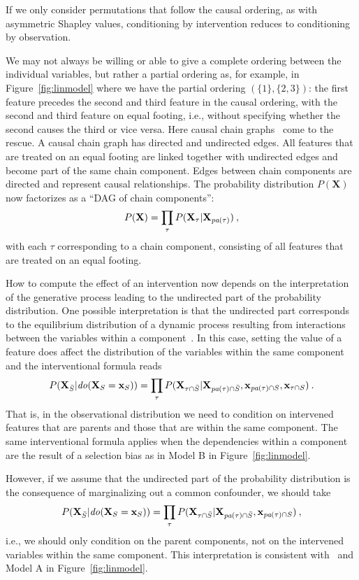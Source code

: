 \documentclass{article}
\newcommand{\vX}{\mathbf{X}}
\newcommand{\vx}{\mathbf{x}}
\newcommand{\dodo}{\mathit{do}}
\newcommand{\lvdo}[1]{\dodo(\vX_{#1} = \vx_{#1})}
\newcommand{\spa}{\mathop{\textit{\scriptsize pa}}}
\begin{document}
If we only consider permutations that follow the causal ordering, as with asymmetric Shapley values, conditioning by intervention reduces to conditioning by observation.

We may not always be willing or able to give a complete ordering between the individual variables, but rather a partial ordering as, for example, in Figure~\ref{fig:linmodel} where we have the partial ordering $(\{1\},\{2,3\})$: the first feature precedes the second and third feature in the causal ordering, with the second and third feature on equal footing, i.e., without specifying whether the second causes the third or vice versa. Here causal chain graphs~\cite{lauritzen2002chain} come to the rescue. A causal chain graph has directed and undirected edges. All features that are treated on an equal footing are linked together with undirected edges and become part of the same chain component. Edges between chain components are directed and represent causal relationships. The probability distribution $P(\vX)$ now factorizes as a ``DAG of chain components'':
\[
P(\vX) = \prod_{\tau} P(\vX_\tau|\vX_{\spa(\tau)}) \: ,
\]
with each $\tau$ corresponding to a chain component, consisting of all features that are treated on an equal footing.

How to compute the effect of an intervention now depends on the interpretation of the generative process leading to the undirected part of the probability distribution. One possible interpretation is that the undirected part corresponds to the equilibrium distribution of a dynamic process resulting from interactions between the variables within a component~\cite{lauritzen2002chain}. In this case, setting the value of a feature does affect the distribution of the variables within the same component and the interventional formula reads
\[
P(\vX_{\bar{S}}|\lvdo{S}) = \prod_{\tau} P(\vX_{\tau \cap \bar{S}}|\vX_{\spa(\tau)  \cap \bar{S}},\vx_{\spa(\tau) \cap S},\vx_{\tau \cap S}) \: .
\]
That is, in the observational distribution we need to condition on intervened features that are parents and those that are within the same component. The same interventional formula applies when the dependencies within a component are the result of a selection bias as in Model B in Figure~\ref{fig:linmodel}.

However, if we assume that the undirected part of the probability distribution is the consequence of marginalizing out a common confounder, we should take
\[
P(\vX_{\bar{S}}|\lvdo{S}) = \prod_{\tau} P(\vX_{\tau \cap \bar{S}}|\vX_{\spa(\tau)  \cap \bar{S}},\vx_{\spa(\tau) \cap S}) \: ,
\]
i.e., we should only condition on the parent components, not on the intervened variables within the same component. This interpretation is consistent with~\cite{janzing2019feature} and Model A in Figure~\ref{fig:linmodel}.
\end{document}
